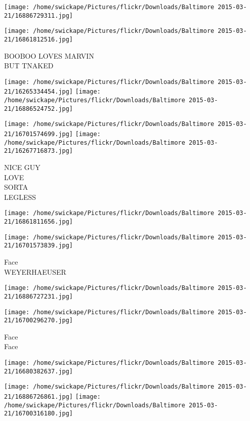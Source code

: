 \documentclass[10pt,letterpaper]{article}
\begin{document}
\texttt{[image: /home/swickape/Pictures/flickr/Downloads/Baltimore 2015-03-21/16886729311.jpg]}

\vspace{0.25in}
\texttt{[image: /home/swickape/Pictures/flickr/Downloads/Baltimore 2015-03-21/16861812516.jpg]}

BOOBOO LOVES MARVIN\\
BUT TNAKED\\
\pagebreak

\texttt{[image: /home/swickape/Pictures/flickr/Downloads/Baltimore 2015-03-21/16265334454.jpg]}
\texttt{[image: /home/swickape/Pictures/flickr/Downloads/Baltimore 2015-03-21/16886524752.jpg]}

\texttt{[image: /home/swickape/Pictures/flickr/Downloads/Baltimore 2015-03-21/16701574699.jpg]}
\texttt{[image: /home/swickape/Pictures/flickr/Downloads/Baltimore 2015-03-21/16267716873.jpg]}

NICE GUY\\
LOVE\\
SORTA\\
LEGLESS\\
\pagebreak

\texttt{[image: /home/swickape/Pictures/flickr/Downloads/Baltimore 2015-03-21/16861811656.jpg]}

\vspace{0.25in}
\texttt{[image: /home/swickape/Pictures/flickr/Downloads/Baltimore 2015-03-21/16701573839.jpg]}

Face\\
WEYERHAEUSER\\
\pagebreak

\texttt{[image: /home/swickape/Pictures/flickr/Downloads/Baltimore 2015-03-21/16886727231.jpg]}

\vspace{0.25in}
\texttt{[image: /home/swickape/Pictures/flickr/Downloads/Baltimore 2015-03-21/16700296270.jpg]}

Face\\
Face\\
\pagebreak

\texttt{[image: /home/swickape/Pictures/flickr/Downloads/Baltimore 2015-03-21/16680382637.jpg]}

\vspace{0.25in}
\texttt{[image: /home/swickape/Pictures/flickr/Downloads/Baltimore 2015-03-21/16886726861.jpg]}
\texttt{[image: /home/swickape/Pictures/flickr/Downloads/Baltimore 2015-03-21/16700316180.jpg]}
\end{document}
